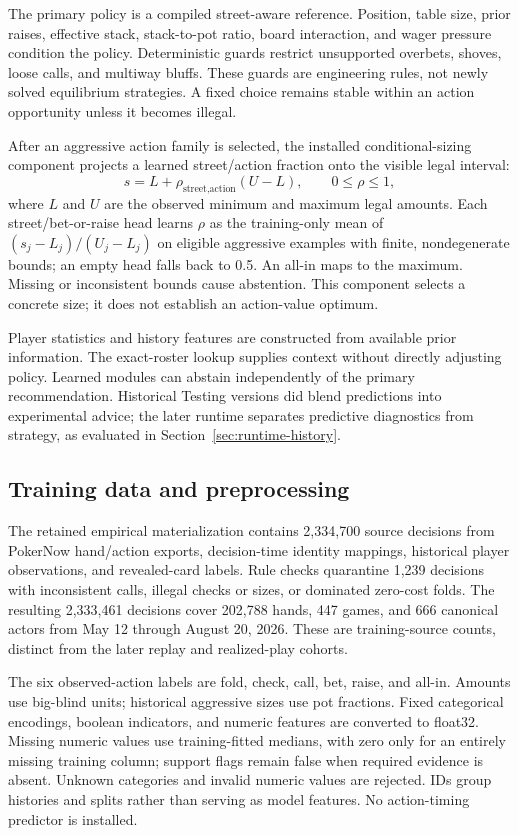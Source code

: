 \documentclass[11pt]{article}
\begin{document}
The primary policy is a compiled street-aware reference. Position, table size, prior raises, effective stack, stack-to-pot ratio, board interaction, and wager pressure condition the policy. Deterministic guards restrict unsupported overbets, shoves, loose calls, and multiway bluffs. These guards are engineering rules, not newly solved equilibrium strategies. A fixed choice remains stable within an action opportunity unless it becomes illegal.

After an aggressive action family is selected, the installed conditional-sizing component projects a learned street/action fraction onto the visible legal interval:
\begin{equation}
s=L+\rho_{\text{street,action}}(U-L), \qquad 0\leq\rho\leq1,
\end{equation}
where \(L\) and \(U\) are the observed minimum and maximum legal amounts. Each street/bet-or-raise head learns \(\rho\) as the training-only mean of \((s_j-L_j)/(U_j-L_j)\) on eligible aggressive examples with finite, nondegenerate bounds; an empty head falls back to 0.5. An all-in maps to the maximum. Missing or inconsistent bounds cause abstention. This component selects a concrete size; it does not establish an action-value optimum.

Player statistics and history features are constructed from available prior information. The exact-roster lookup supplies context without directly adjusting policy. Learned modules can abstain independently of the primary recommendation. Historical Testing versions did blend predictions into experimental advice; the later runtime separates predictive diagnostics from strategy, as evaluated in Section~\ref{sec:runtime-history}.

\subsection{Training data and preprocessing}
The retained empirical materialization contains 2,334,700 source decisions from PokerNow hand/action exports, decision-time identity mappings, historical player observations, and revealed-card labels. Rule checks quarantine 1,239 decisions with inconsistent calls, illegal checks or sizes, or dominated zero-cost folds. The resulting 2,333,461 decisions cover 202,788 hands, 447 games, and 666 canonical actors from May 12 through August 20, 2026. These are training-source counts, distinct from the later replay and realized-play cohorts.

The six observed-action labels are fold, check, call, bet, raise, and all-in. Amounts use big-blind units; historical aggressive sizes use pot fractions. Fixed categorical encodings, boolean indicators, and numeric features are converted to float32. Missing numeric values use training-fitted medians, with zero only for an entirely missing training column; support flags remain false when required evidence is absent. Unknown categories and invalid numeric values are rejected. IDs group histories and splits rather than serving as model features. No action-timing predictor is installed.
\end{document}
